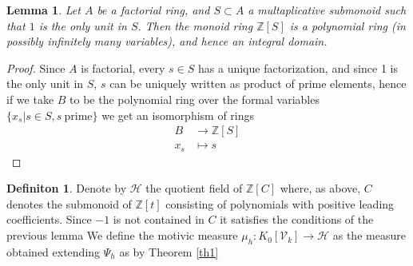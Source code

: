 \documentclass[11pt, a4paper, german]{article}
\theoremstyle{plain}
\newtheorem{lemma}[theorem]{Lemma}
\theoremstyle{definition}
\newtheorem{definition}[theorem]{Definiton}
\newcommand{\gring}[1][k]{K_0[\mathcal{V}_#1]}
\begin{document}
\begin{lemma}
    Let $A$ be a factorial ring, and $S \subset A$ a multaplicative submonoid such that $1$ is the only unit in $S$. Then the monoid ring
    $\mathbb{Z}[S]$ is a polynomial ring (in possibly infinitely many variables), and hence an integral domain.
\end{lemma}
\begin{proof}
    Since $A$ is factorial, every $s \in S$ has a unique factorization, and since 1 is the only unit in $S$, 
    $s$ can be uniquely written as product of prime elements, hence if we take $B$ to be the polynomial ring over the formal
    variables $\{x_s | s \in S, s\ \text{prime}\}$ we get an isomorphism of rings
    \begin{align*}
        B &\to \mathbb{Z}[S] \\
        x_s &\mapsto s
    \end{align*}
\end{proof}

\begin{definition}
    Denote by $\mathcal{H}$ the quotient field of $\mathbb{Z}[C]$ where, as above, $C$ denotes the submonoid of $\mathbb{Z}[t]$ 
    consisting of polynomials with positive leading coefficients. Since $-1$ is not contained in $C$ it satisfies the conditions of the
    previous lemma
    We define the motivic measure $\mu_h \colon \gring \to \mathcal{H}$ as the measure obtained extending $\Psi_h$ as by Theorem \ref{th1}
\end{definition}
\end{document}
